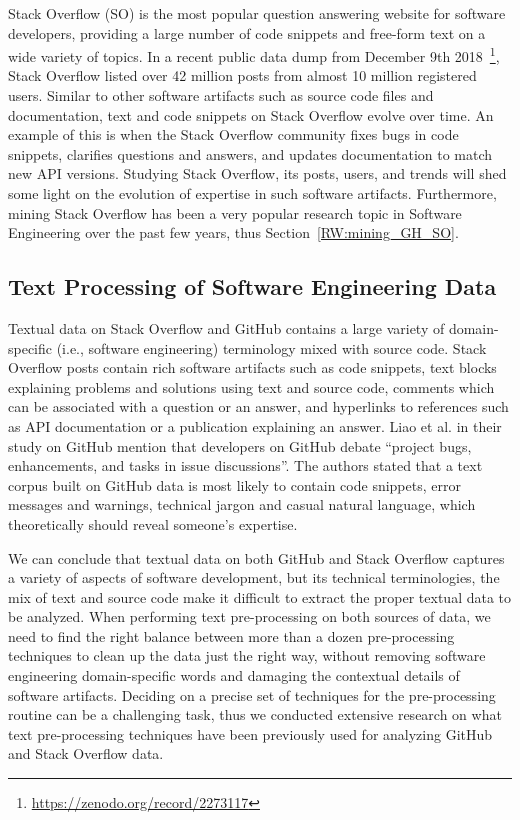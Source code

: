         Stack Overflow (SO) is the most popular question answering website for software developers, providing a large number of code snippets and free-form text on a wide variety of topics. In a recent public data dump from December 9th 2018~\footnote{\url{https://zenodo.org/record/2273117}}, Stack Overflow listed over 42 million posts from almost 10 million registered users. Similar to other software artifacts such as source code files and documentation, text and code snippets on Stack Overflow evolve over time. An example of this is when the Stack Overflow community fixes bugs in code snippets, clarifies questions and answers, and updates documentation to match new API versions. Studying Stack Overflow, its posts, users, and trends will shed some light on the evolution of expertise in such software artifacts. Furthermore, mining Stack Overflow has been a very popular research topic in Software Engineering over the past few years, thus Section~\ref{RW:mining_GH_SO}.
        
    \subsection{Text Processing of Software Engineering Data \label{background:text_processing}}
        Textual data on Stack Overflow and GitHub contains a large variety of domain-specific (i.e., software engineering) terminology mixed with source code. Stack Overflow posts contain rich software artifacts such as code snippets, text blocks explaining problems and solutions using text and source code, comments which can be associated with a question or an answer, and hyperlinks to references such as API documentation or a publication explaining an answer. Liao et al. \cite{liao2019status} in their study on GitHub mention that developers on GitHub debate ``project bugs, enhancements, and tasks in issue discussions''. The authors stated that a text corpus built on GitHub data is most likely to contain
        code snippets, error messages and warnings, technical jargon and casual natural language, which theoretically should reveal someone's expertise.
        
        We can conclude that textual data on both GitHub and Stack Overflow captures a variety of aspects of software development, but its technical terminologies, the mix of text and source code make it difficult to extract the proper textual data to be analyzed. When performing text pre-processing on both sources of data, we need to find the right balance between more than a dozen pre-processing techniques to clean up the data just the right way, without removing software engineering domain-specific words and damaging the contextual details of software artifacts. Deciding on a precise set of techniques for the pre-processing routine can be a challenging task, thus we conducted extensive research on what text pre-processing techniques have been previously used for analyzing GitHub and Stack Overflow data.
        
